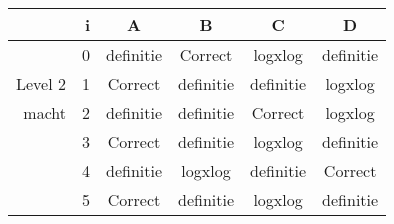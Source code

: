 \begin{tabular}{ rr| c|c|c|c}\hline\hline
     & i & \textbf{A} & \textbf{B} & \textbf{C} & \textbf{D}\\\hline

&0&definitie&Correct\cellcolor[gray]{0.6}&logxlog&definitie\\
Level 2 & 1&Correct\cellcolor[gray]{0.6}&definitie&definitie&logxlog\\
macht &2&definitie&definitie&Correct\cellcolor[gray]{0.6}&logxlog\\
&3&Correct\cellcolor[gray]{0.6}&definitie&logxlog&definitie\\
&4&definitie&logxlog&definitie&Correct\cellcolor[gray]{0.6}\\
&5&Correct\cellcolor[gray]{0.6}&definitie&logxlog&definitie\\
\hline\end{tabular}\par\ \newline


